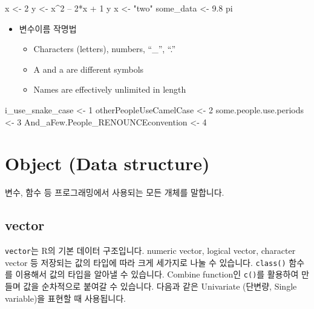 \documentclass[
]{book}
\newenvironment{Shaded}{\begin{snugshade}}{\end{snugshade}}
\newcommand{\DecValTok}[1]{\textcolor[rgb]{0.00,0.00,0.81}{#1}}
\newcommand{\FloatTok}[1]{\textcolor[rgb]{0.00,0.00,0.81}{#1}}
\newcommand{\NormalTok}[1]{#1}
\newcommand{\OtherTok}[1]{\textcolor[rgb]{0.56,0.35,0.01}{#1}}
\newcommand{\SpecialCharTok}[1]{\textcolor[rgb]{0.00,0.00,0.00}{#1}}
\newcommand{\StringTok}[1]{\textcolor[rgb]{0.31,0.60,0.02}{#1}}
\providecommand{\tightlist}{%
  \setlength{\itemsep}{0pt}\setlength{\parskip}{0pt}}
\begin{document}
\begin{Shaded}
\begin{Highlighting}[]
\NormalTok{x }\OtherTok{\textless{}{-}} \DecValTok{2}
\NormalTok{y }\OtherTok{\textless{}{-}}\NormalTok{ x}\SpecialCharTok{\^{}}\DecValTok{2}\NormalTok{ – }\DecValTok{2}\SpecialCharTok{*}\NormalTok{x }\SpecialCharTok{+} \DecValTok{1}
\NormalTok{y}
\NormalTok{x }\OtherTok{\textless{}{-}} \StringTok{"two"}  
\NormalTok{some\_data }\OtherTok{\textless{}{-}} \FloatTok{9.8}
\NormalTok{pi}
\end{Highlighting}
\end{Shaded}

\begin{itemize}
\tightlist
\item
  변수이름 작명법

  \begin{itemize}
  \tightlist
  \item
    Characters (letters), numbers, ``\_'', ``.''
  \item
    A and a are different symbols
  \item
    Names are effectively unlimited in length
  \end{itemize}
\end{itemize}

\begin{Shaded}
\begin{Highlighting}[]
\NormalTok{i\_use\_snake\_case }\OtherTok{\textless{}{-}} \DecValTok{1}
\NormalTok{otherPeopleUseCamelCase }\OtherTok{\textless{}{-}} \DecValTok{2}
\NormalTok{some.people.use.periods }\OtherTok{\textless{}{-}} \DecValTok{3}
\NormalTok{And\_aFew.People\_RENOUNCEconvention }\OtherTok{\textless{}{-}} \DecValTok{4}
\end{Highlighting}
\end{Shaded}

\hypertarget{object-data-structure}{%
\section{Object (Data structure)}\label{object-data-structure}}

변수, 함수 등 프로그래밍에서 사용되는 모든 개체를 말합니다.

\hypertarget{vector}{%
\subsection{vector}\label{vector}}

\texttt{vector}는 R의 기본 데이터 구조입니다. numeric vector, logical vector, character vector 등 저장되는 값의 타입에 따라 크게 세가지로 나눌 수 있습니다. \texttt{class()} 함수를 이용해서 값의 타입을 알아낼 수 있습니다. Combine function인 \texttt{c()}를 활용하여 만들며 값을 순차적으로 붙여갈 수 있습니다. 다음과 같은 Univariate (단변량, Single variable)을 표현할 때 사용됩니다.
\end{document}
